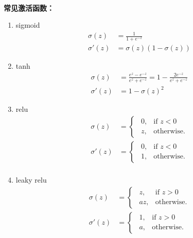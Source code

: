 ~\\
\noindent\textbf{常见激活函数：}
\begin{enumerate}
  \item sigmoid
  \begin{align*}
    \sigma(z) &= \frac{1}{1+e^{-z}}\\
    \sigma'(z) &= \sigma(z)(1-\sigma(z))
  \end{align*}

  \item tanh
  \begin{align*}
    \sigma(z) &= \frac{e^z-e^{-z}}{e^z+e^{-z}} = 1- \frac{2e^{-z}}{e^z + e^{-z}}\\
    \sigma'(z) &= 1-\sigma(z)^2
  \end{align*}

  \item relu
  \begin{align*}
    \sigma(z) &= \begin{cases}
                   ~~0, & \mbox{if } z<0 \\
                   ~~z, & \mbox{otherwise}.
                 \end{cases}\\
    \sigma'(z) &= \begin{cases}
                   ~~0, & \mbox{if } z<0 \\
                   ~~1, & \mbox{otherwise}.
                 \end{cases}\\
  \end{align*}

  \item leaky relu
  \begin{align*}
    \sigma(z) &= \begin{cases}
                   ~~z, & \mbox{if } z>0 \\
                   ~~az, & \mbox{otherwise}.
                 \end{cases}\\
    \sigma'(z) &= \begin{cases}
                   ~~1, & \mbox{if } z>0 \\
                   ~~a, & \mbox{otherwise}.
                 \end{cases}\\
  \end{align*}


\end{enumerate}
